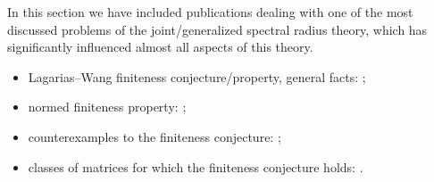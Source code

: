 \documentclass[a4paper,fleqn]{article}
\let\cite=\citep
\begin{document}
In this section we have included publications dealing with one of the
most discussed problems of the joint/generalized spectral radius
theory, which has significantly influenced almost all aspects of this
theory.
\begin{itemize}
  \item Lagarias--Wang finiteness conjecture/property, general facts:
    \cite{BTV:MTNS02, Charina:ACHA13, DHX:PAMS13, GugZen:LAA12,
      JenPoll:ETDS17, Koz:LAA16, Koz:WSDV16, LagWang:LAA95, Morris:LAA10};
  \item normed finiteness property: \cite{LiShih:LAA08};
  \item counterexamples to the finiteness conjecture: \cite{BochiMor:PLMS15,
      BM:JAMS02, BTV:SIAMJMA03, CJ:IJAMCS07, Gao:ArXiv25, Gao:BLMS26,
      HMST:AdvMath11, JenPoll:ETDS17, JP:SIAMJMA09, Koz:CDC05:e, Koz:WIAS05,
      Koz:INFOPROC06:e};
  \item classes of matrices for which the finiteness conjecture holds:
    \cite{AhmJun14, AhmJng:NAHS16, BN:SIAMJMAA09, Charina:ACHA13,
      CGSZ:LAA10, CiconePhD11, Dai:ArXiv11, Dai:LAA13, DHLX:LAA12,
      DHX:ArXiv13:1, DHX:PAMS13, DK:INFOPROC11:e, Gurv:LAA95, GWZ:SIAMJMA05,
      JB:LAA08, JM:LAA13, Koz:LAA16, KZW:AM26, LagWang:LAA95, LiuXiao:LNCS12,
      Mejstrik:DRNA22, Morris:LAA10, Morris:ArXiv11, PanScl:Nonlin21,
      PW:LAA08, WangWen:CIS13}.
\end{itemize}
\end{document}
